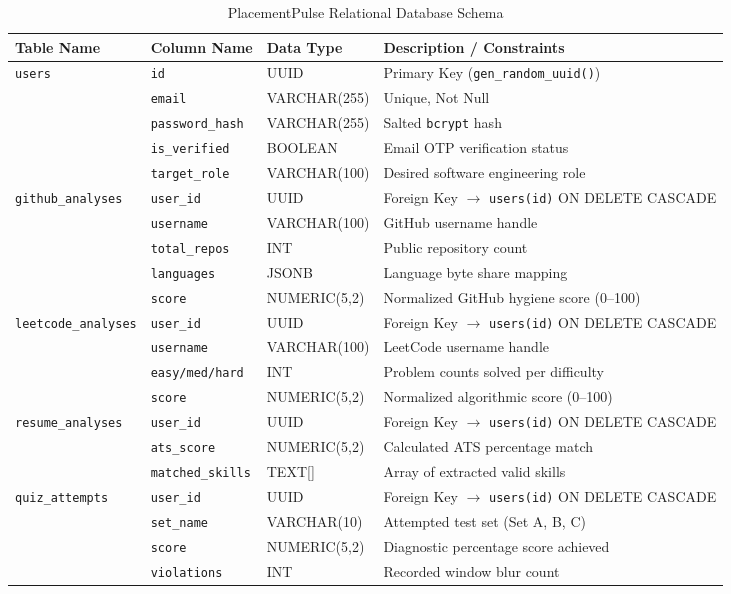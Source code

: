 \begin{table}[htbp]
\centering
\scriptsize
\caption{PlacementPulse Relational Database Schema}
\label{tab:database_schema}
\begin{tabularx}{\textwidth}{l l l X}
\toprule
\textbf{Table Name} & \textbf{Column Name} & \textbf{Data Type} & \textbf{Description / Constraints} \\
\midrule
\texttt{users} & \texttt{id} & UUID & Primary Key (\texttt{gen\_random\_uuid()}) \\
& \texttt{email} & VARCHAR(255) & Unique, Not Null \\
& \texttt{password\_hash} & VARCHAR(255) & Salted \texttt{bcrypt} hash \\
& \texttt{is\_verified} & BOOLEAN & Email OTP verification status \\
& \texttt{target\_role} & VARCHAR(100) & Desired software engineering role \\
\addlinespace
\texttt{github\_analyses} & \texttt{user\_id} & UUID & Foreign Key $\rightarrow$ \texttt{users(id)} ON DELETE CASCADE \\
& \texttt{username} & VARCHAR(100) & GitHub username handle \\
& \texttt{total\_repos} & INT & Public repository count \\
& \texttt{languages} & JSONB & Language byte share mapping \\
& \texttt{score} & NUMERIC(5,2) & Normalized GitHub hygiene score (0--100) \\
\addlinespace
\texttt{leetcode\_analyses} & \texttt{user\_id} & UUID & Foreign Key $\rightarrow$ \texttt{users(id)} ON DELETE CASCADE \\
& \texttt{username} & VARCHAR(100) & LeetCode username handle \\
& \texttt{easy/med/hard} & INT & Problem counts solved per difficulty \\
& \texttt{score} & NUMERIC(5,2) & Normalized algorithmic score (0--100) \\
\addlinespace
\texttt{resume\_analyses} & \texttt{user\_id} & UUID & Foreign Key $\rightarrow$ \texttt{users(id)} ON DELETE CASCADE \\
& \texttt{ats\_score} & NUMERIC(5,2) & Calculated ATS percentage match \\
& \texttt{matched\_skills} & TEXT[] & Array of extracted valid skills \\
\addlinespace
\texttt{quiz\_attempts} & \texttt{user\_id} & UUID & Foreign Key $\rightarrow$ \texttt{users(id)} ON DELETE CASCADE \\
& \texttt{set\_name} & VARCHAR(10) & Attempted test set (Set A, B, C) \\
& \texttt{score} & NUMERIC(5,2) & Diagnostic percentage score achieved \\
& \texttt{violations} & INT & Recorded window blur count \\
\bottomrule
\end{tabularx}
\end{table}

